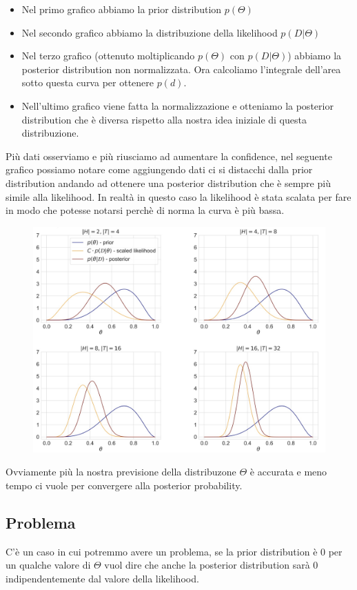 \documentclass[14pt]{extreport}
\begin{document}
\begin{itemize}
	\item Nel primo grafico abbiamo la prior distribution $p(\Theta)$
	\item Nel secondo grafico abbiamo la distribuzione della likelihood $p(D|\Theta)$
	\item Nel terzo grafico (ottenuto moltiplicando $p(\Theta)$ con $p(D|\Theta)$) abbiamo la posterior distribution non normalizzata. Ora calcoliamo
	      l'integrale dell'area sotto questa curva per ottenere $p(d)$.
	\item Nell'ultimo grafico viene fatta la normalizzazione e otteniamo la posterior distribution che è diversa rispetto alla nostra idea iniziale di
	questa distribuzione.
\end{itemize}

Più dati osserviamo e più riusciamo ad aumentare la confidence, nel seguente grafico possiamo notare come aggiungendo dati ci si distacchi dalla prior
distribution andando ad ottenere una posterior distribution che è sempre più simile alla likelihood. In realtà in questo caso la likelihood è stata
scalata per fare in modo che potesse notarsi perchè di norma la curva è più bassa.

\begin{figure}[H]
	\centering
	\includegraphics[width=0.7\linewidth]{32.jpeg}
\end{figure}

Ovviamente più la nostra previsione della distribuzone $\Theta$ è accurata e meno tempo ci vuole per convergere alla posterior probability.

\subsection{Problema}

C'è un caso in cui potremmo avere un problema, se la prior distribution è 0 per un qualche valore di $\Theta$ vuol dire che anche la posterior
distribution sarà 0 indipendentemente dal valore della likelihood.
\end{document}
